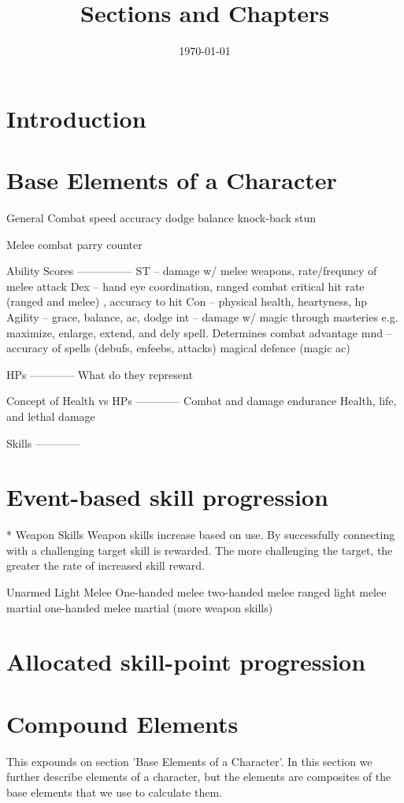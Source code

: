 \documentclass{article}
\title{Sections and Chapters}
\author{}
\date{\today}
\begin{document}
 
\maketitle
 
\section{Introduction}

\section{Base Elements of a Character}
General Combat
speed 
accuracy
dodge
balance
knock-back
stun

 
Melee combat
parry
counter

Ability Scores
---------------
ST – damage w/ melee weapons, rate/frequncy of melee attack
Dex – hand eye coordination, ranged combat critical hit rate (ranged and melee) , accuracy to hit
Con – physical health, heartyness, hp
Agility – grace, balance, ac, dodge
int – damage w/ magic through masteries e.g. maximize, enlarge, extend, and dely spell. Determines combat advantage
mnd – accuracy of spells (debufs, enfeebs, attacks) magical defence (magic ac)

HPs
------------
What do they represent

Concept of Health vs HPs
------------
Combat and damage endurance
Health, life, and lethal damage

Skills
------------
\section{Event-based skill progression}
* Weapon Skills
Weapon skills increase based on use.
By successfully connecting with a challenging target skill is rewarded.
The more challenging the target, the greater the rate of increased skill reward.

Unarmed
Light Melee
One-handed melee
two-handed melee
ranged
light melee martial
one-handed melee martial
(more weapon skills)


\section{Allocated skill-point progression}



\section{Compound Elements}
This expounds on section 'Base Elements of a Character'.
In this section we further describe elements of a character, but the elements are composites of the base elements that we use to calculate them. 
\end{document}
